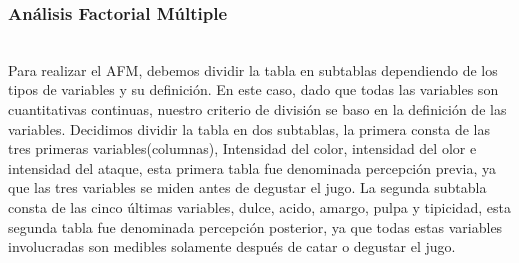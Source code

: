 \documentclass[12pt]{beamer}
\begin{document}
\begin{frame}
\frametitle{Análisis Factorial Múltiple}
~\\Para realizar el AFM, debemos dividir la tabla en subtablas dependiendo de los tipos de variables y su definición. En este caso, dado que todas las variables son cuantitativas continuas, nuestro criterio de división se baso en la definición de las variables. Decidimos dividir la tabla en dos subtablas, la primera consta de las tres primeras variables(columnas), Intensidad del color, intensidad del olor e intensidad del ataque, esta primera tabla fue denominada percepción previa, ya que las tres variables se miden antes de degustar el jugo. La segunda subtabla consta de las cinco últimas variables, dulce, acido, amargo, pulpa y tipicidad, esta segunda tabla fue denominada percepción posterior, ya que todas estas variables involucradas son medibles solamente después de catar o degustar el jugo.
\end{frame}
\end{document}

